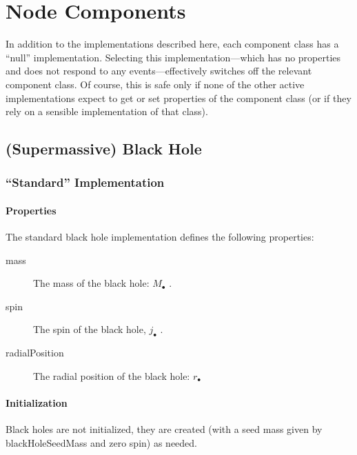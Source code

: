 \chapter{Node Components}\label{sec:Components}

In addition to the implementations described here, each component class has a ``{\normalfont \ttfamily null}'' implementation. Selecting this implementation---which has no properties and does not respond to any events---effectively switches off the relevant component class. Of course, this is safe only if none of the other active implementations expect to get or set properties of the component class (or if they rely on a sensible implementation of that class).

\section{(Supermassive) Black Hole}

\subsection{``Standard'' Implementation}

\subsubsection{Properties}

The standard black hole implementation defines the following properties:
\begin{description}
 \item [{\normalfont \ttfamily mass}] The mass of the black hole: $M_\bullet$ {\normalfont \ttfamily [blackHoleMass]}.
 \item [{\normalfont \ttfamily spin}] The spin of the black hole, $j_\bullet$ {\normalfont \ttfamily [blackHoleSpin]}.
 \item [{\normalfont \ttfamily radialPosition}] The radial position of the black hole: $r_\bullet$ {\normalfont \ttfamily [blackHoleRadialPosition]} 
\end{description}

\subsubsection{Initialization}

Black holes are not initialized, they are created (with a seed mass given by {\normalfont \ttfamily blackHoleSeedMass} and zero spin) as needed.

